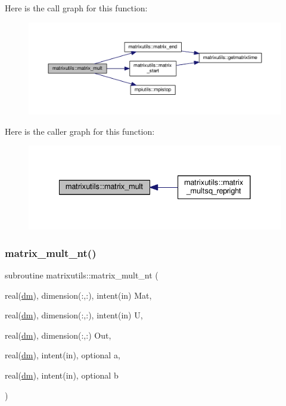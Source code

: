 Here is the call graph for this function\+:
\nopagebreak
\begin{figure}[H]
\begin{center}
\leavevmode
\includegraphics[width=350pt]{namespacematrixutils_aa6a8ab9e79a8dd522f5375ebf4a50372_cgraph}
\end{center}
\end{figure}
Here is the caller graph for this function\+:
\nopagebreak
\begin{figure}[H]
\begin{center}
\leavevmode
\includegraphics[width=332pt]{namespacematrixutils_aa6a8ab9e79a8dd522f5375ebf4a50372_icgraph}
\end{center}
\end{figure}
\mbox{\label{namespacematrixutils_a4a084a8c031469076ac26bf4e9055109}} 
\subsubsection{\texorpdfstring{matrix\+\_\+mult\+\_\+nt()}{matrix\_mult\_nt()}}
{\footnotesize\ttfamily subroutine matrixutils\+::matrix\+\_\+mult\+\_\+nt (\begin{DoxyParamCaption}\item[{real(\mbox{\hyperlink{namespacematrixutils_a7bdc564986ea4d90f51201c75606ef3d}{dm}}), dimension(\+:,\+:), intent(in)}]{Mat,  }\item[{real(\mbox{\hyperlink{namespacematrixutils_a7bdc564986ea4d90f51201c75606ef3d}{dm}}), dimension(\+:,\+:), intent(in)}]{U,  }\item[{real(\mbox{\hyperlink{namespacematrixutils_a7bdc564986ea4d90f51201c75606ef3d}{dm}}), dimension(\+:,\+:)}]{Out,  }\item[{real(\mbox{\hyperlink{namespacematrixutils_a7bdc564986ea4d90f51201c75606ef3d}{dm}}), intent(in), optional}]{a,  }\item[{real(\mbox{\hyperlink{namespacematrixutils_a7bdc564986ea4d90f51201c75606ef3d}{dm}}), intent(in), optional}]{b }\end{DoxyParamCaption})}



